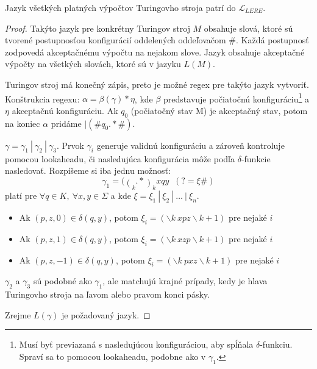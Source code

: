 \documentclass{svk_long_sk}
\def\lel{\mathscr{L}_{LERE}}
\begin{document}
\begin{theorem}
Jazyk všetkých platných výpočtov Turingovho stroja patrí do $\lel$.
\end{theorem}
\begin{proof}
Takýto jazyk pre konkrétny Turingov stroj $M$ obsahuje slová, ktoré sú tvorené postupnosťou konfigurácií oddelených oddeľovačom \#. Každá postupnosť zodpovedá akceptačnému výpočtu na nejakom slove. Jazyk obsahuje akceptačné výpočty na všetkých slovách, ktoré sú v jazyku $L(M)$.

Turingov stroj má konečný zápis, preto je možné regex pre takýto jazyk vytvoriť. Konštrukcia regexu: $\alpha = \beta(\gamma)*\eta$, kde $\beta$ predstavuje počiatočnú konfiguráciu\footnote{Musí byť previazaná s nasledujúcou konfiguráciou, aby spĺňala $\delta$-funkciu. Spraví sa to pomocou lookaheadu, podobne ako v $\gamma_1$.} a $\eta$ akceptačnú konfiguráciu. Ak $q_0$ (počiatočný stav M) je akceptačný stav, potom na koniec $\alpha$ pridáme $|(\#q_0.*\#)$. 

$\gamma = \gamma_1~|~\gamma_2~|~\gamma_3$.	Prvok $\gamma_i$ generuje validnú konfiguráciu a zároveň kontroluje pomocou lookaheadu, či nasledujúca konfigurácia môže podľa $\delta$-funkcie nasledovať. Rozpíšeme si iba jednu možnosť: 
 $$ \displaystyle \gamma_1=(\mathop(_k.*\mathop)_k x q y \mathop(_{k+1} .* \mathop)_{k+1} \#)(?= \xi \#)$$ platí pre $\forall q \in K,~\forall x,y \in \Sigma$ a kde $ \xi = \xi_1 ~|~ \xi_2 ~|~ \dots ~|~ \xi_n $.
\begin{itemize}
\item Ak $ (p,z,0) \in \delta(q,y)$, potom $\xi_i = (\backslash k~x p z \backslash k+1)$ pre nejaké $i$
\item Ak $ (p,z,1) \in \delta(q,y)$, potom $\xi_i = (\backslash k~x z p \backslash k+1)$ pre nejaké $i$
\item Ak $ (p,z,-1) \in \delta(q,y)$, potom $\xi_i = (\backslash k~p x z \backslash k+1)$ pre nejaké $i$
\end{itemize}

$\gamma_2$ a $\gamma_3$ sú podobné ako $\gamma_1$, ale matchujú krajné prípady, kedy je hlava Turingovho stroja na ľavom alebo pravom konci pásky.

Zrejme $L(\gamma)$ je požadovaný jazyk.
\end{proof}
\end{document}

